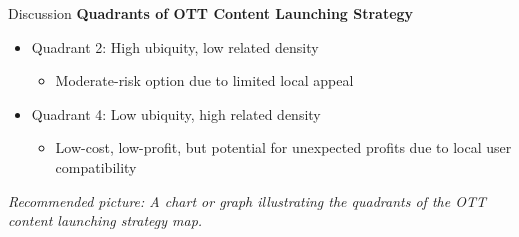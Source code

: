 \documentclass[
  ignorenonframetext,
]{beamer}
\providecommand{\tightlist}{%
  \setlength{\itemsep}{0pt}\setlength{\parskip}{0pt}}\usepackage{longtable,booktabs,array}
\begin{document}
\begin{frame}{Discussion}
\protect\hypertarget{discussion-3}{}
\textbf{Quadrants of OTT Content Launching Strategy}

\begin{itemize}
\item
  Quadrant 2: High ubiquity, low related density

  \begin{itemize}
  \tightlist
  \item
    Moderate-risk option due to limited local appeal
  \end{itemize}
\item
  Quadrant 4: Low ubiquity, high related density

  \begin{itemize}
  \tightlist
  \item
    Low-cost, low-profit, but potential for unexpected profits due to
    local user compatibility
  \end{itemize}
\end{itemize}

\emph{Recommended picture: A chart or graph illustrating the quadrants
of the OTT content launching strategy map.}
\end{frame}
\end{document}
